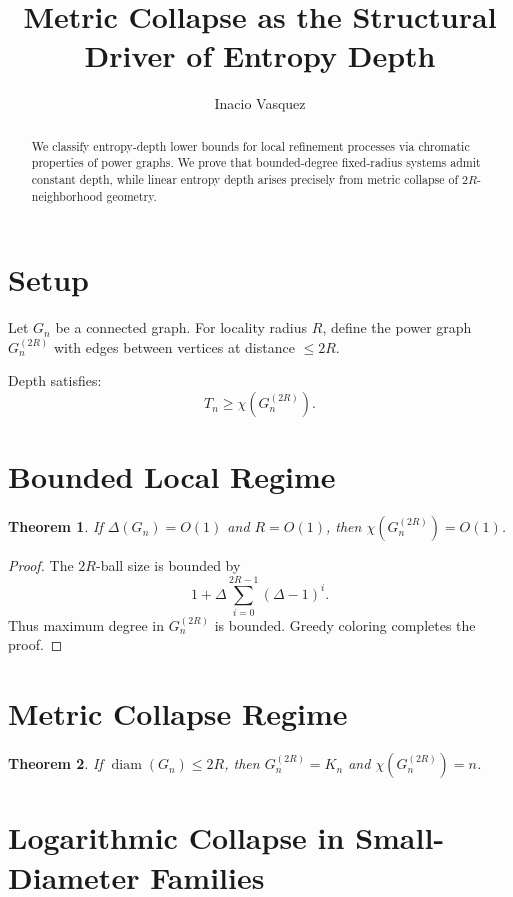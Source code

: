 \documentclass[11pt]{article}
\title{Metric Collapse as the Structural Driver of Entropy Depth}
\author{Inacio Vasquez}
\date{}
\newtheorem{theorem}{Theorem}
\begin{document}
\maketitle

\begin{abstract}
We classify entropy-depth lower bounds for local refinement processes
via chromatic properties of power graphs.
We prove that bounded-degree fixed-radius systems admit constant depth,
while linear entropy depth arises precisely from metric collapse
of $2R$-neighborhood geometry.
\end{abstract}

\section{Setup}

Let $G_n$ be a connected graph.
For locality radius $R$, define the power graph $G_n^{(2R)}$
with edges between vertices at distance $\le 2R$.

Depth satisfies:
\[
T_n \ge \chi(G_n^{(2R)}).
\]

\section{Bounded Local Regime}

\begin{theorem}
If $\Delta(G_n)=O(1)$ and $R=O(1)$,
then $\chi(G_n^{(2R)}) = O(1)$.
\end{theorem}

\begin{proof}
The $2R$-ball size is bounded by
\[
1 + \Delta \sum_{i=0}^{2R-1} (\Delta-1)^i.
\]
Thus maximum degree in $G_n^{(2R)}$ is bounded.
Greedy coloring completes the proof.
\end{proof}

\section{Metric Collapse Regime}

\begin{theorem}
If $\operatorname{diam}(G_n) \le 2R$,
then $G_n^{(2R)} = K_n$ and
$\chi(G_n^{(2R)}) = n$.
\end{theorem}

\section{Logarithmic Collapse in Small-Diameter Families}
\end{document}
